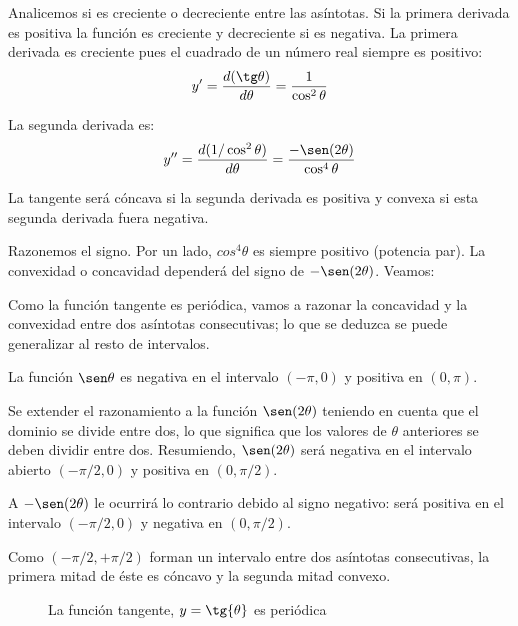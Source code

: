 Analicemos si es creciente o decreciente entre las asíntotas. Si la primera
derivada es positiva la función es creciente y decreciente si es negativa.
La primera derivada es creciente pues el cuadrado de un número real siempre
es positivo:
\[
y' = \frac{d(\tg\theta)}{d\theta} = \frac{1}{\cos^{2}\theta}
\]

La segunda derivada es:
\[
y'' = \frac{d(1/\cos^{2}\theta)}{d\theta} = 
\frac{-\sen(2\theta)}{\cos^{4}\theta}
\]

La tangente será cóncava si la segunda derivada es positiva y convexa
si esta segunda derivada fuera negativa.

Razonemos el signo. Por un lado, $cos^{4}\theta$ es siempre positivo
(potencia par).
La convexidad o concavidad dependerá del signo de $-\sen (2\theta)$.
Veamos:

Como la función tangente es periódica, vamos a razonar la concavidad y la
convexidad entre dos asíntotas consecutivas; lo que se deduzca se puede
generalizar al resto de intervalos.

La función $\sen\theta$ es negativa en el intervalo $(-\pi,0)$ y positiva en
$(0,\pi)$.

Se extender el razonamiento a la función $\sen (2\theta)$ teniendo en cuenta
que el dominio se divide entre dos, lo que significa que los valores de
$\theta$ anteriores se deben dividir entre dos.
Resumiendo, $\sen (2\theta)$ será negativa en el intervalo abierto $(-\pi/2,0)$
y positiva en $(0,\pi/2)$.

A $-\sen (2\theta)$ le ocurrirá lo contrario debido al signo negativo:
será positiva en el intervalo $(-\pi/2,0)$ y negativa en $(0,\pi/2)$.

Como $(-\pi/2,+\pi/2)$ forman un intervalo entre dos asíntotas consecutivas,
la primera mitad de éste es cóncavo y la segunda mitad convexo.

\begin{figure}[ht]
\centering
{}
\caption{La función tangente, $y=\tg{\theta}$ es periódica}
\end{figure}

